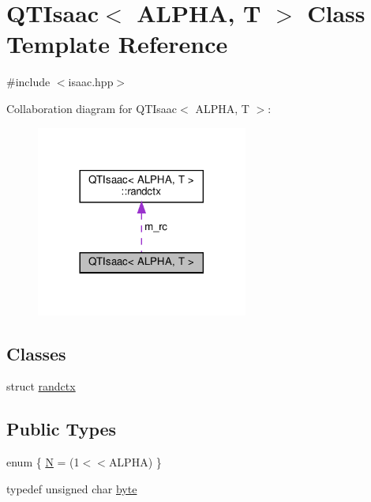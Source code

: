 \hypertarget{classQTIsaac}{}\section{Q\+T\+Isaac$<$ A\+L\+P\+HA, T $>$ Class Template Reference}
\label{classQTIsaac}


{\ttfamily \#include $<$isaac.\+hpp$>$}



Collaboration diagram for Q\+T\+Isaac$<$ A\+L\+P\+HA, T $>$\+:\nopagebreak
\begin{figure}[H]
\begin{center}
\leavevmode
\includegraphics[width=197pt]{classQTIsaac__coll__graph}
\end{center}
\end{figure}
\subsection*{Classes}
\begin{DoxyCompactItemize}
\item 
struct \hyperlink{structQTIsaac_1_1randctx}{randctx}
\end{DoxyCompactItemize}
\subsection*{Public Types}
\begin{DoxyCompactItemize}
\item 
enum \{ \hyperlink{classQTIsaac_a2f9d908d12a5725146e161998b733233a44174520f740123b364728ca92b3dc97}{N} = (1$<$$<$A\+L\+P\+HA)
 \}
\item 
typedef unsigned char \hyperlink{classQTIsaac_a1f78939d0806ed6006253a9ead8052b3}{byte}
\end{DoxyCompactItemize}
